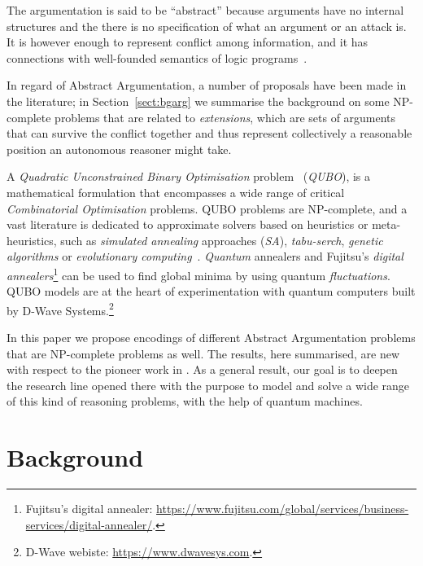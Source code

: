 \documentclass[conference,compsocconf]{IEEEtran}
\begin{document}
The argumentation is said to be ``abstract'' because arguments have no internal structures and the there is no specification of what an argument or an attack is. It is however enough to represent conflict among information, and it has connections with well-founded semantics of logic programs~\cite{Dung:1995}.

In regard of Abstract Argumentation, a number of proposals have been made in the literature; in Section~\ref{sect:bgarg} we summarise the background on  some NP-complete problems  that are related to \emph{extensions}, which are sets of arguments that can survive the conflict together and thus represent collectively a reasonable position an autonomous reasoner might take. 


A \emph{Quadratic Unconstrained Binary Optimisation} problem~\cite{firstworkqubo} (\emph{QUBO}),  is a mathematical formulation that  encompasses a wide range of critical \emph{Combinatorial Optimisation} problems.  QUBO problems are  NP-complete, and a vast literature is dedicated to approximate solvers  based on heuristics or meta-heuristics, such as  \emph{simulated annealing} approaches (\emph{SA}), \emph{tabu-serch}, \emph{genetic algorithms} or \emph{evolutionary computing}~\cite{survey1}. \emph{Quantum} annealers  and Fujitsu's \emph{digital annealers}\footnote{Fujitsu's digital annealer: \url{https://www.fujitsu.com/global/services/business-services/digital-annealer/}.} can be used to find global minima by using quantum \emph{fluctuations}.  QUBO models are  at the heart of experimentation with quantum computers built by D-Wave Systems.\footnote{D-Wave webiste: \url{https://www.dwavesys.com}.}

In this paper we propose encodings of different Abstract Argumentation problems that are NP-complete problems as well. The  results, here summarised, are new with respect to the pioneer  work in \cite{pricai22}. As a general result, our goal is to deepen  the research line opened there with the purpose to model  and solve a wide range of this kind of reasoning problems, with the help of quantum machines.

\section{Background}\label{sect:background}
\end{document}
